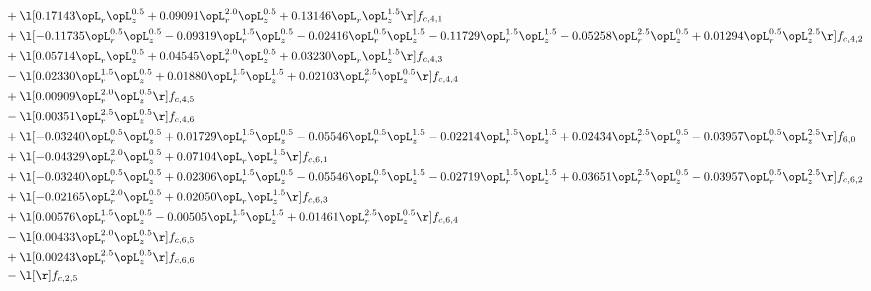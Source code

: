 \begin{alignat}{2}
& + \l[  0.17143 \opL_r \opL_z^{0.5} +  0.09091 \opL_r^{2.0} \opL_z^{0.5} +  0.13146 \opL_r \opL_z^{1.5}  \r] f_{c,4,1} \nonumber \\ 
& + \l[  -0.11735 \opL_r^{0.5} \opL_z^{0.5}   -0.09319 \opL_r^{1.5} \opL_z^{0.5}   -0.02416 \opL_r^{0.5} \opL_z^{1.5}   -0.11729 \opL_r^{1.5} \opL_z^{1.5}   -0.05258 \opL_r^{2.5} \opL_z^{0.5} +  0.01294 \opL_r^{0.5} \opL_z^{2.5}  \r] f_{c,4,2} \nonumber \\ 
& + \l[  0.05714 \opL_r \opL_z^{0.5} +  0.04545 \opL_r^{2.0} \opL_z^{0.5} +  0.03230 \opL_r \opL_z^{1.5}  \r] f_{c,4,3} \nonumber \\ 
& - \l[  0.02330 \opL_r^{1.5} \opL_z^{0.5} +  0.01880 \opL_r^{1.5} \opL_z^{1.5} +  0.02103 \opL_r^{2.5} \opL_z^{0.5}  \r] f_{c,4,4} \nonumber \\ 
& + \l[  0.00909 \opL_r^{2.0} \opL_z^{0.5}  \r] f_{c,4,5} \nonumber \\ 
& - \l[  0.00351 \opL_r^{2.5} \opL_z^{0.5}  \r] f_{c,4,6} \nonumber \\ 
& + \l[  -0.03240 \opL_r^{0.5} \opL_z^{0.5} +  0.01729 \opL_r^{1.5} \opL_z^{0.5}   -0.05546 \opL_r^{0.5} \opL_z^{1.5}   -0.02214 \opL_r^{1.5} \opL_z^{1.5} +  0.02434 \opL_r^{2.5} \opL_z^{0.5}   -0.03957 \opL_r^{0.5} \opL_z^{2.5}  \r] f_{6,0} \nonumber \\ 
& + \l[  -0.04329 \opL_r^{2.0} \opL_z^{0.5} +  0.07104 \opL_r \opL_z^{1.5}  \r] f_{c,6,1} \nonumber \\ 
& + \l[  -0.03240 \opL_r^{0.5} \opL_z^{0.5} +  0.02306 \opL_r^{1.5} \opL_z^{0.5}   -0.05546 \opL_r^{0.5} \opL_z^{1.5}   -0.02719 \opL_r^{1.5} \opL_z^{1.5} +  0.03651 \opL_r^{2.5} \opL_z^{0.5}   -0.03957 \opL_r^{0.5} \opL_z^{2.5}  \r] f_{c,6,2} \nonumber \\ 
& + \l[  -0.02165 \opL_r^{2.0} \opL_z^{0.5} +  0.02050 \opL_r \opL_z^{1.5}  \r] f_{c,6,3} \nonumber \\ 
& + \l[  0.00576 \opL_r^{1.5} \opL_z^{0.5}   -0.00505 \opL_r^{1.5} \opL_z^{1.5} +  0.01461 \opL_r^{2.5} \opL_z^{0.5}  \r] f_{c,6,4} \nonumber \\ 
& - \l[  0.00433 \opL_r^{2.0} \opL_z^{0.5}  \r] f_{c,6,5} \nonumber \\ 
& + \l[  0.00243 \opL_r^{2.5} \opL_z^{0.5}  \r] f_{c,6,6} \nonumber \\ 
& - \l[  \r] f_{c,2,5} \nonumber \\ 
\end{alignat} 


